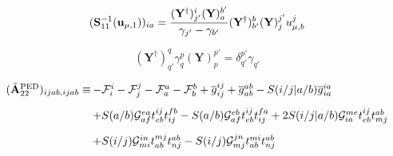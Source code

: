 \begin{subappendices}
\begin{equation}
    (\mathbf{S}_{11}^{-1}(\mathbf{u}_{\mu,1}))_{ia}
    =
    \frac{%
        (\mathbf{Y}^\dagger)_{j'}^i
        (\mathbf{Y})_a^{b'}
    }{%
        \gamma_{j'}-\gamma_{b'}
    }
    (\mathbf{Y}^\dagger)_{b'}^b
    (\mathbf{Y})_j^{j'}
    u_{\mu,b}^j
\end{equation}

\begin{equation}
    (\mathbf{Y}^\dagger)_{q'}^q
    \gamma_q^p
    (\mathbf{Y})_p^{p'}
    =
    \delta_{q'}^{p'}
    \gamma_{q'}
\end{equation}


\begin{equation}
    \begin{array}{r@{\,}l}
        (\tilde{\mathbf{A}}_{22}^\mathrm{PED})_{ijab,ijab}
        \equiv
        &
        -
        \mathcal{F}_i^i
        -
        \mathcal{F}_j^j
        -
        \mathcal{F}_a^a
        -
        \mathcal{F}_b^b
        +
        \overline{g}_{ij}^{ij}
        +
        \overline{g}_{ab}^{ab}
        -
        S(i/j|a/b)
        \overline{g}_{ia}^{ia}
        \\[10pt]
        &
        +
        S(a/b)
        \mathcal{G}_{af}^{ea}
        t_{eb}^{ij}
        t_{ij}^{fb}
        -
        S(a/b)
        \mathcal{G}_{af}^{eb}
        t_{eb}^{ij}
        t_{ij}^{fa}
        +
        2
        S(i/j|a/b)
        \mathcal{G}_{ia}^{me}
        t_{eb}^{ij}
        t_{mj}^{ab}
        \\[10pt]
        &
        +
        S(i/j)
        \mathcal{G}_{mi}^{in}
        t_{ab}^{mj}
        t_{nj}^{ab}
        -
        S(i/j)
        \mathcal{G}_{mj}^{jn}
        t_{ab}^{mi}
        t_{nj}^{ab}
    \end{array}
\end{equation}


\end{subappendices}
